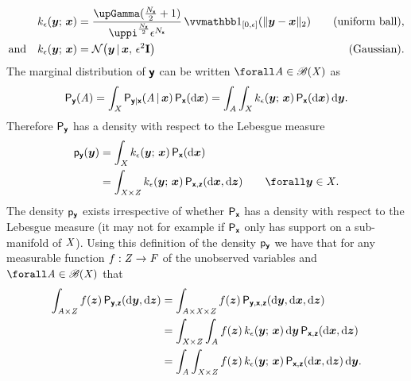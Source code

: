 \begin{align}
\label{eq:uniform-ball-abc-kernel}
  k_\epsilon(\vct{y};\,\vct{x}) &=
  \frac{\upGamma(\frac{N_{\rvct{x}}}{2}+1)}{\uppi^{\frac{N_{\rvct{x}}}{2}} \epsilon^{N_{\rvct{x}}}} 
  \ind{[0,\epsilon]}\lpa\Vert\vct{y} - \vct{x}\Vert_2\rpa & 
  \quad \textrm{(uniform ball)},\\
\label{eq:gaussian-abc-kernel}
  \textrm{and}\quad
  k_\epsilon(\vct{y};\,\vct{x}) &= 
  \nrm{\vct{y}\gvn\vct{x},\,\epsilon^2\idmtx} &
  \quad \textrm{(Gaussian)}. 
\end{align}
The marginal distribution of $\boldsymbol{\mathsf{y}}$ can be written $\forall \set{A} \in \borel(\set{X})$ as
\begin{equation}
  \prob{\rvct{y}}(\set{A}) = 
  \int_{\set{X}} \prob{\rvct{y}|\rvct{x}}\lpa \set{A} \gvn \vct{x} \rpa
  \,\prob{\rvct{x}}(\dr \vct{x})
  =
  \int_{\set{A}} \int_{\set{X}}
    k_\epsilon(\vct{y};\,\vct{x})\,
  \prob{\rvct{x}}(\dr \vct{x})\,\dr\vct{y}.
\end{equation}
Therefore $\mathsf{P}_{\boldsymbol{\mathsf{y}}}$ has a density with respect to the Lebesgue measure
\begin{equation}\label{eq:abc-marginal-density}
\begin{split}
  \pden{\rvct{y}}(\vct{y})
  &=
  \int_{\set{X}}
    k_\epsilon(\vct{y};\,\vct{x})\,
  \prob{\rvct{x}}(\dr \vct{x})
  \\
  &=
  \int_{\set{X}\times\set{Z}}
    k_\epsilon(\vct{y};\,\vct{x})\,
  \prob{\rvct{x},\rvct{z}}(\dr \vct{x},\dr \vct{z})
  \qquad \forall \vct{y} \in \set{X}.
\end{split}
\end{equation}
The density $\mathsf{p}_{\boldsymbol{\mathsf{y}}}$ exists irrespective of whether $\mathsf{P}_{\boldsymbol{\mathsf{x}}}$ has a density with respect to the Lebesgue measure (it may not for example if $\mathsf{P}_{\boldsymbol{\mathsf{x}}}$ only has support on a sub-manifold of $\mathit{X}$). Using this definition of the density $\mathsf{p}_{\boldsymbol{\mathsf{y}}}$ we have that for any measurable function $f : \mathit{Z} \to \mathit{F}$ of the unobserved variables and $\forall \set{A} \in \borel(\set{X})$ that
\begin{equation}
  \label{eq:abc-conditional-expectation-derivation-1}
\begin{split}
  \int_{\mathit{A} \times \mathit{Z}} 
    f(\boldsymbol{z}) 
  \,\mathsf{P}_{\boldsymbol{\mathsf{y}},\boldsymbol{\mathsf{z}}}(\mathrm{d} \boldsymbol{y},\mathrm{d} \boldsymbol{z}) 
  &=
  \int_{\mathit{A} \times \mathit{X} \times \mathit{Z}} 
    f(\boldsymbol{z}) 
  \,\mathsf{P}_{\boldsymbol{\mathsf{y}},\boldsymbol{\mathsf{x}},\boldsymbol{\mathsf{z}}}(\mathrm{d}\boldsymbol{y},\mathrm{d}\boldsymbol{x},\mathrm{d}\boldsymbol{z})
  \\
  &=
  \int_{\mathit{X} \times \mathit{Z}} \int_{\mathit{A}}
    f(\boldsymbol{z})\,
    k_{\epsilon}(\boldsymbol{y};\,\boldsymbol{x})
  \,\mathrm{d}\boldsymbol{y}
  \,\mathsf{P}_{\boldsymbol{\mathsf{x}},\boldsymbol{\mathsf{z}}}(\mathrm{d}\boldsymbol{x},\mathrm{d}\boldsymbol{z})
  \\
  &=
  \int_{\mathit{A}} \int_{\mathit{X} \times \mathit{Z}} 
    f(\boldsymbol{z})\,
    k_{\epsilon}(\boldsymbol{y};\,\boldsymbol{x})
  \,\mathsf{P}_{\boldsymbol{\mathsf{x}},\boldsymbol{\mathsf{z}}}(\mathrm{d}\boldsymbol{x},\mathrm{d}\boldsymbol{z})
 \,\mathrm{d}\boldsymbol{y}.
\end{split}
\end{equation}
